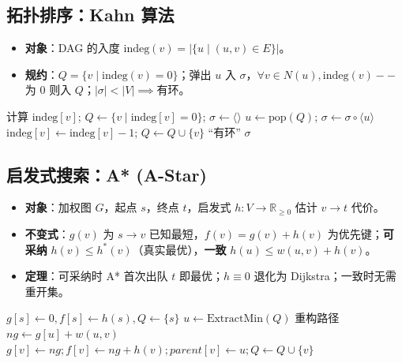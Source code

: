 \subsection{拓扑排序：Kahn 算法}
\begin{itemize}
    \item \textbf{对象}：DAG 的入度 $\text{indeg}(v)=|\{u\mid(u,v)\in E\}|$。
    \item \textbf{规约}：$Q=\{v\mid\text{indeg}(v)=0\}$；弹出 $u$ 入 $\sigma$，$\forall v\in N(u),\text{indeg}(v)--$ 为 $0$ 则入 $Q$；$|\sigma|<|V|\implies$有环。
\end{itemize}

\begin{algorithm}[H]
\caption{Kahn 拓扑排序规约}
\begin{algorithmic}[1]
    \State 计算 $\text{indeg}[v]$; $Q\gets\{v\mid\text{indeg}[v]=0\}$; $\sigma\gets\langle\rangle$
        \State $u\gets\text{pop}(Q)$; $\sigma\gets\sigma\circ\langle u\rangle$
         $\text{indeg}[v]\gets\text{indeg}[v]-1$;  $Q\gets Q\cup\{v\}$ \EndIf \EndFor
    \EndWhile
     \Return “有环” \Else \Return $\sigma$ \EndIf
\EndProcedure
\end{algorithmic}
\end{algorithm}

\subsection{启发式搜索：A* (A-Star)}
\begin{itemize}
    \item \textbf{对象}：加权图 $G$，起点 $s$，终点 $t$，启发式 $h:V\to\mathbb{R}_{\ge0}$ 估计 $v\to t$ 代价。
    \item \textbf{不变式}：$g(v)$ 为 $s\to v$ 已知最短，$f(v)=g(v)+h(v)$ 为优先键；\textbf{可采纳} $h(v)\le h^*(v)$（真实最优），\textbf{一致} $h(u)\le w(u,v)+h(v)$。
    \item \textbf{定理}：可采纳时 A* 首次出队 $t$ 即最优；$h\equiv0$ 退化为 Dijkstra；一致时无需重开集。
\end{itemize}

\begin{algorithm}[H]
\caption{A* 规约}
\begin{algorithmic}[1]
\State $g[s]\gets0, f[s]\gets h(s), Q\gets\{s\}$ 
    \State $u\gets\text{ExtractMin}(Q)$ 
     \Return 重构路径 \EndIf
        \State $ng\gets g[u]+w(u,v)$
         $g[v]\gets ng; f[v]\gets ng+h(v); parent[v]\gets u; Q\gets Q\cup\{v\}$ \EndIf
    \EndFor
\EndWhile
\end{algorithmic}
\end{algorithm}

